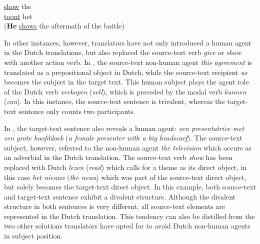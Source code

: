 \documentclass[output=paper]{LSP/langsci}
\begin{document}
\ea \label{ex:5:12}
\ea
{} \ul{show} the \\[1em]
\ex {} \ul{toont} het \\
(\textbf{He} \ul{shows} the aftermath of the battle)
\z
\z
{}


In other instances, however, translators have not only introduced a human agent in the Dutch translations, but also replaced the source-text verb \textit{give} or \textit{show} with another action verb. In , the source-text non-human agent \textit{this agreement} is translated as a prepositional object in Dutch, while the source-text recipient \textit{us} becomes the subject in the target text. This human subject plays the agent role of the Dutch verb \textit{verkopen} (\textit{sell}), which is preceded by the modal verb \textit{kunnen} (\textit{can}). In this instance, the source-text sentence is trivalent, whereas the target-text sentence only counts two participants. 

In , the target-text sentence also reveals a human agent: \textit{een presentatrice met een grote hoofddoek} (\textit{a female presenter with a big headscarf}). The source-text subject, however, referred to the non-human agent \textit{the television} which occurs as an adverbial in the Dutch translation. The source-text verb \textit{show} has been replaced with Dutch \textit{lezen} (\textit{read}) which calls for a theme as its direct object, in this case \textit{het nieuws} (\textit{the news}) which was part of the source-text direct object, but solely becomes the target-text direct object. In this example, both source-text and target-text sentence exhibit a divalent structure. Although the divalent structure in both sentences is very different, all source-text elements are represented in the Dutch translation. This tendency can also be distilled from the two other solutions translators have opted for to avoid Dutch non-human agents in subject position.             

\end{document}
